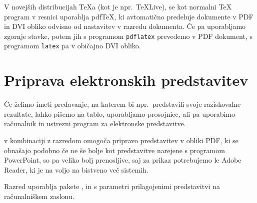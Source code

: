 V novejših distribucijah \TeX{}a (kot je npr.~\TeX{}Live), se kot
normalni \TeX{} program v resnici uporablja pdf\TeX{}, ki avtomatično
predeluje dokumente v PDF in DVI obliko odvisno od nastavitev v 
razredu dokumenta. Če pa uporabljamo zgornje stavke, potem jih 
s  programom \verb|pdflatex| prevedemo v PDF dokument,
s programom \verb|latex| pa v običajno DVI obliko.

\section{Priprava elektronskih predstavitev}
\label{sec:beamer}
Če želimo imeti predavanje, na katerem bi npr.~predstavili svoje raziskovalne rezultate,
lahko pišemo na tablo, uporabljamo prosojnice, ali pa uporabimo
računalnik in ustrezni program za elektronske predstavitve. 

 v kombinaciji z razredom  omogoča 
pripravo predstavitev v obliki PDF, ki se obnašajo podobno če ne še
bolje kot predstavitve narejene s programom PowerPoint, so pa veliko
bolj prenosljive, saj za prikaz potrebujemo le Adobe Reader, ki je
na voljo na bistveno več sistemih.

Razred  uporablja pakete ,  in
 s parametri prilagojenimi predstavitvi na računalniškem
zaslonu.


